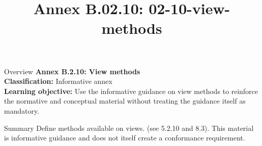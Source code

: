 \documentclass[10pt,letterpaper]{article}
\title{Annex B.02.10: 02-10-view-methods}
\author{}
\date{}
\begin{document}
\maketitle
\begin{CornellOverviewBox}{Overview}
{\Large\bfseries\textcolor{CNavy}{Annex B.2.10: View methods}}\\[3pt]
{\small\textbf{Classification:} Informative annex}\\
{\small\textbf{Learning objective:} Use the informative guidance on view methods to reinforce the normative and conceptual material without treating the guidance itself as mandatory.}
\end{CornellOverviewBox}
\vspace{3pt}

\begin{CornellNotesTable}
\end{CornellNotesTable}


\begin{CornellSummaryBox}{Summary}
Define methods available on views. (see 5.2.10 and 8.3). This material is informative guidance and does not itself create a conformance requirement.
\end{CornellSummaryBox}
\end{document}
